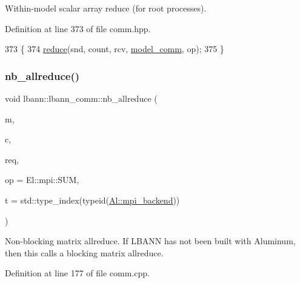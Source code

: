 Within-\/model scalar array reduce (for root processes). 

Definition at line 373 of file comm.\+hpp.


\begin{DoxyCode}
373                                                                       \{
374     \hyperlink{classlbann_1_1lbann__comm_ab8a2261394c978aa7e4b74ecebc739a8}{reduce}(snd, count, rcv, \hyperlink{classlbann_1_1lbann__comm_a58a75b76bd61ec8a26c1cbbec3dc2f45}{model\_comm}, op);
375   \}
\end{DoxyCode}
\mbox{\label{classlbann_1_1lbann__comm_a2a7bb6cf3707366fc0671d8894ca30ea}} 
\subsubsection{\texorpdfstring{nb\+\_\+allreduce()}{nb\_allreduce()}\hspace{0.1cm}{\footnotesize\ttfamily [1/2]}}
{\footnotesize\ttfamily void lbann\+::lbann\+\_\+comm\+::nb\+\_\+allreduce (\begin{DoxyParamCaption}\item[{\hyperlink{base_8hpp_a9a697a504ae84010e7439ffec862b470}{Abs\+Dist\+Mat} \&}]{m,  }\item[{const El\+::mpi\+::\+Comm}]{c,  }\item[{\hyperlink{structlbann_1_1Al_1_1request}{Al\+::request} \&}]{req,  }\item[{El\+::mpi\+::\+Op}]{op = {\ttfamily El\+:\+:mpi\+:\+:SUM},  }\item[{std\+::type\+\_\+index}]{t = {\ttfamily std\+:\+:type\+\_\+index(typeid(\hyperlink{namespacelbann_1_1Al_a8a69c2fac7e1117883fff1903c2232ce}{Al\+::mpi\+\_\+backend}))} }\end{DoxyParamCaption})}

Non-\/blocking matrix allreduce. If L\+B\+A\+NN has not been built with Aluminum, then this calls a blocking matrix allreduce. 

Definition at line 177 of file comm.\+cpp.


